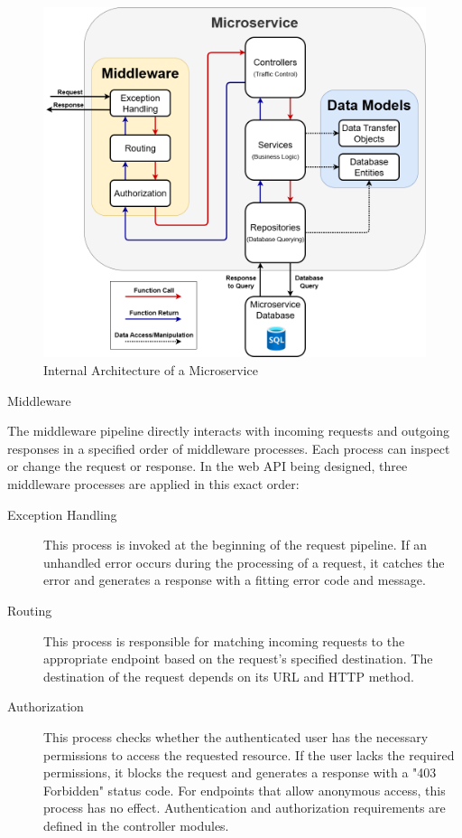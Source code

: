 \documentclass[12pt,reqno, oneside]{amsbook}
\makeatletter
\def\subsection{\@startsection{subsection}{2}%
      \z@{.5\linespacing\@plus.7\linespacing}{.25\linespacing}%
      {\normalfont\bfseries\flushleft}}
\theoremstyle{definition}
\theoremstyle{definition}
\numberwithin{section}{chapter}
\numberwithin{table}{chapter}
\numberwithin{figure}{chapter}
\makeatother
\begin{document}
\begin{figure}[H]
  \centering
  \includegraphics[width=1\linewidth]{images/InternalMicroserviceArchitecture.png}
  \caption{\label{Figure:InternalMicroserviceArchitecture}Internal Architecture of a Microservice}
\end{figure}

\pagebreak

\subsection{Middleware}

The middleware pipeline directly interacts with incoming requests and outgoing responses in a specified order of middleware processes. Each process can inspect or change the request or response. In the web \ac{API} being designed, three middleware processes are applied in this exact order:

\begin{description}
  \item[Exception Handling] This process is invoked at the beginning of the request pipeline. If an unhandled error occurs during the processing of a request, it catches the error and generates a response with a fitting error code and message.
  \item[Routing] This process is responsible for matching incoming requests to the appropriate endpoint based on the request's specified destination. The destination of the request depends on its \Ac{URL} and \ac{HTTP} method.
  \item[Authorization] This process checks whether the authenticated user has the necessary permissions to access the requested resource. If the user lacks the required permissions, it blocks the request and generates a response with a "403 Forbidden" status code. For endpoints that allow anonymous access, this process has no effect. Authentication and authorization requirements are defined in the controller modules.
\end{description}
\end{document}
